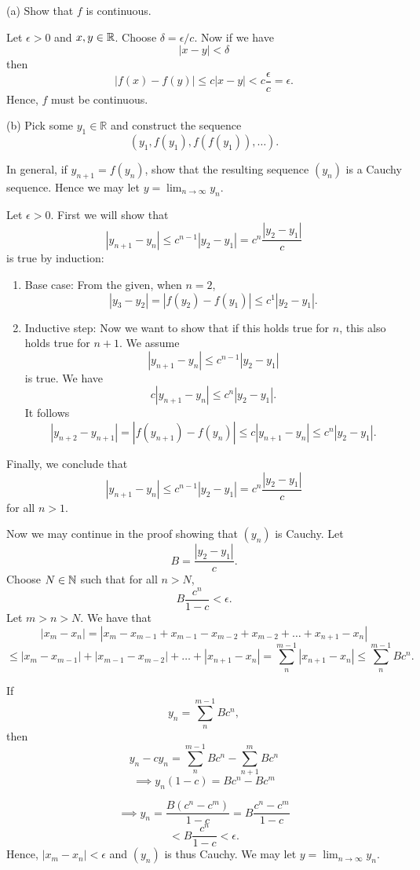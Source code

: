 \documentclass{report}
\begin{document}
(a) Show that $f$ is continuous.
\par
\bigskip
\begin{myproof}
    
Let $\epsilon > 0$ and $x,y \in \RR$. Choose $\delta= \epsilon/c$. Now if we have $$|x-y| < \delta$$ then $$|f(x) - f(y)| \leq c|x-y| < c \frac{\epsilon}{c} = \epsilon.$$
Hence, $f$ must be continuous.
\end{myproof}

\bigskip
\bigskip
(b) Pick some $y_1 \in \mathbb{R}$ and construct the sequence
$$
\left(y_1, f\left(y_1\right), f\left(f\left(y_1\right)\right), \ldots\right) .
$$

In general, if $y_{n+1}=f\left(y_n\right)$, show that the resulting sequence $\left(y_n\right)$ is a Cauchy sequence. Hence we may let $y=\lim _{n \rightarrow \infty} y_n$.

\bigskip
\begin{myproof}
  Let $\epsilon > 0.$ First we will show that $$|y_{n+1} - y_n| \leq c^{n-1}|y_2 - y_1|=c^{n}\frac{|y_2 - y_1|}{c}$$ is true by induction:
\bigskip
\par
\begin{enumerate}
  \item Base case: From the given, when $n=2$, $$|y_3 - y_2| =|f(y_2) - f(y_1)| \leq c^1|y_2 -y_1|.$$
  \item Inductive step: Now we want to show that if this holds true for $n$, this also holds true for $n+1$. We assume  $$ |y_{n+1} - y_n| \leq c^{n-1}|y_2 - y_1|$$ is true. We have $$ c|y_{n+1} - y_n| \leq c^{n}|y_2 - y_1|.$$ It follows
    $$|y_{n+2} - y_{n+1}| =|f(y_{n+1}) - f(y_{n})| \leq c|y_{n+1} - y_n| \leq c^{n}|y_2 - y_1|.$$
\end{enumerate}


Finally, we conclude that  $$|y_{n+1} - y_n| \leq c^{n-1}|y_2 - y_1|=c^{n}\frac{|y_2 - y_1|}{c}$$
for all $n > 1.$

\pagebreak
\bigskip
\par
Now we may continue in the proof showing that $(y_n)$ is Cauchy. Let $$B = \frac{|y_2 - y_1|}{c}.$$
Choose $N \in \NN$ such that for all $n>N$,$$B\frac{c^n}{1  - c}< \epsilon.$$ Let  $m > n > N.$  We have that  
  $$ |x_m - x_n|= |x_m - x_{m-1} + x_{m-1} - x_{m-2} + x_{m-2} + \dots + x_{n+1}- x_n| $$
$$\leq |x_m - x_{m-1}| + |x_{m-1} - x_{m-2}| +  \dots + |x_{n+1}- x_n| = \sum_{n}^{m-1}|x_{n+1} - x_n| \leq \sum_{n}^{m-1}Bc^{n}.$$

If $$y_n =\sum_{n}^{m-1}B c^{n},$$ then $$y_n  - cy_n = \sum_{n}^{m-1}B c^{n} - \sum_{n+1}^{m}Bc^{n}$$
$$\implies y_n(1  - c) = Bc^n - Bc^m $$

$$\implies y_n = \frac{B(c^n - c^m) }{1  - c}= B\frac{c^n - c^m }{1  - c} $$
$$< B\frac{c^n}{1  - c} < \epsilon.$$
Hence, $ |x_m - x_n| < \epsilon$ and $(y_n)$ is thus Cauchy. We may let $y=\lim _{n \rightarrow \infty} y_n.$

\end{myproof}
\end{document}
